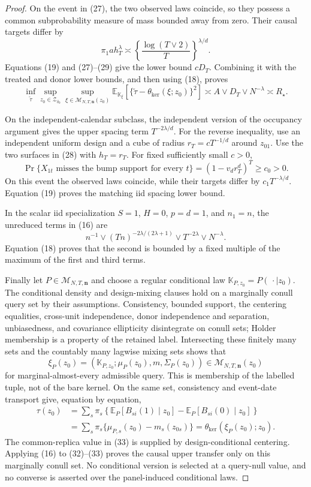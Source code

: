 \documentclass{article}
\begin{document}
\begin{proof}
On the event in (27), the two observed laws coincide, so they possess a
common subprobability measure of mass bounded away from zero.  Their causal
targets differ by
\[
 \pi_1ah_T^\lambda
 \asymp\left\{\frac{\log(T\vee2)}{T}\right\}^{\lambda/d}.    \tag{29}
\]
Equations (19) and (27)--(29) give the lower bound \(cD_T\).  Combining it
with the treated and donor lower bounds, and then using (18), proves
\[
 \inf_{\widetilde\tau}\sup_{z_0\in\mathcal Z_{\delta_0}}
 \sup_{\xi\in\mathcal M_{N,T,\mathbf n}(z_0)}
 \mathbb E_{\mathbb K_\xi}
 [\{\widetilde\tau-\theta_{\mathrm{ker}}(\xi;z_0)\}^2]
 \asymp A\vee D_T\vee N^{-\lambda}\asymp R_\star.          \tag{30}
\]

On the independent-calendar subclass, the independent version of the
occupancy argument gives the upper spacing term \(T^{-2\lambda/d}\).  For
the reverse inequality, use an independent uniform design and a cube of
radius \(r_T=cT^{-1/d}\) around \(z_{01}\).  Use the two surfaces in (28)
with \(h_T=r_T\).  For fixed sufficiently small \(c>0\),
\[
 \Pr\{X_{1t}\text{ misses the bump support for every }t\}
 =(1-v_dr_T^d)^T\ge c_0>0.                                   \tag{31}
\]
On this event the observed laws coincide, while their targets differ by
\(c_1T^{-\lambda/d}\).  Equation (19) proves the matching iid spacing
lower bound.

In the scalar iid specialization \(S=1\), \(H=0\), \(p=d=1\), and
\(n_1=n\), the unreduced terms in (16) are
\[
 n^{-1}\vee(Tn)^{-2\lambda/(2\lambda+1)}
 \vee T^{-2\lambda}\vee N^{-\lambda}.
\]
Equation (18) proves that the second is bounded by a fixed multiple of the
maximum of the first and third terms.

Finally let \(P\in\mathcal M_{N,T,\mathbf n}\) and choose a regular
conditional law \(\mathbb K_{P,z_0}=P(\,\cdot\mid z_0)\).  The conditional
density and design-mixing clauses hold on a marginally conull query set by
their assumptions.  Consistency, bounded support, the centering equalities,
cross-unit independence, donor independence and separation, unbiasedness,
and covariance ellipticity disintegrate on conull sets; Holder membership is
a property of the retained label.  Intersecting these finitely many sets and
the countably many lagwise mixing sets shows that
\[
 \xi_P(z_0)=(\mathbb K_{P,z_0};\mu_P(z_0),m,\Sigma_P(z_0))
 \in\mathcal M_{N,T,\mathbf n}(z_0)                           \tag{32}
\]
for marginal-almost-every admissible query.  This is membership of the
labelled tuple, not of the bare kernel.  On the same set, consistency and
event-date transport give, equation by equation,
\[
 \begin{split}
 \tau(z_0)
 &=\sum_s\pi_s\left\{
   \mathbb E_P[B_{si}(1)\mid z_0]
  -\mathbb E_P[B_{si}(0)\mid z_0]\right\}\\
 &=\sum_s\pi_s\{\mu_{P,s}(z_0)-m_s(z_{0s})\}
 =\theta_{\mathrm{ker}}(\xi_P(z_0);z_0).                     \tag{33}
 \end{split}
\]
The common-replica value in (33) is supplied by design-conditional
centering.  Applying (16) to (32)--(33) proves the causal upper transfer
only on this marginally conull set.  No conditional version is selected at a
query-null value, and no converse is asserted over the panel-induced
conditional laws.
\end{proof}
\end{document}
